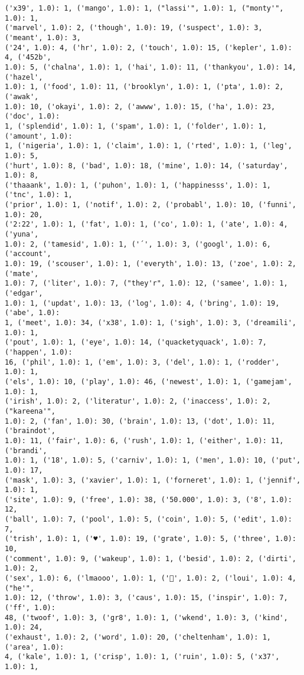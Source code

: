 \documentclass[11pt]{article}
\begin{document}
\begin{Verbatim}[commandchars=\\\{\}]
('x39', 1.0): 1, ('mango', 1.0): 1, ("lassi'", 1.0): 1, ("monty'", 1.0): 1,
('marvel', 1.0): 2, ('though', 1.0): 19, ('suspect', 1.0): 3, ('meant', 1.0): 3,
('24', 1.0): 4, ('hr', 1.0): 2, ('touch', 1.0): 15, ('kepler', 1.0): 4, ('452b',
1.0): 5, ('chalna', 1.0): 1, ('hai', 1.0): 11, ('thankyou', 1.0): 14, ('hazel',
1.0): 1, ('food', 1.0): 11, ('brooklyn', 1.0): 1, ('pta', 1.0): 2, ('awak',
1.0): 10, ('okayi', 1.0): 2, ('awww', 1.0): 15, ('ha', 1.0): 23, ('doc', 1.0):
1, ('splendid', 1.0): 1, ('spam', 1.0): 1, ('folder', 1.0): 1, ('amount', 1.0):
1, ('nigeria', 1.0): 1, ('claim', 1.0): 1, ('rted', 1.0): 1, ('leg', 1.0): 5,
('hurt', 1.0): 8, ('bad', 1.0): 18, ('mine', 1.0): 14, ('saturday', 1.0): 8,
('thaaank', 1.0): 1, ('puhon', 1.0): 1, ('happinesss', 1.0): 1, ('tnc', 1.0): 1,
('prior', 1.0): 1, ('notif', 1.0): 2, ('probabl', 1.0): 10, ('funni', 1.0): 20,
('2:22', 1.0): 1, ('fat', 1.0): 1, ('co', 1.0): 1, ('ate', 1.0): 4, ('yuna',
1.0): 2, ('tamesid', 1.0): 1, ('´', 1.0): 3, ('googl', 1.0): 6, ('account',
1.0): 19, ('scouser', 1.0): 1, ('everyth', 1.0): 13, ('zoe', 1.0): 2, ('mate',
1.0): 7, ('liter', 1.0): 7, ("they'r", 1.0): 12, ('samee', 1.0): 1, ('edgar',
1.0): 1, ('updat', 1.0): 13, ('log', 1.0): 4, ('bring', 1.0): 19, ('abe', 1.0):
1, ('meet', 1.0): 34, ('x38', 1.0): 1, ('sigh', 1.0): 3, ('dreamili', 1.0): 1,
('pout', 1.0): 1, ('eye', 1.0): 14, ('quacketyquack', 1.0): 7, ('happen', 1.0):
16, ('phil', 1.0): 1, ('em', 1.0): 3, ('del', 1.0): 1, ('rodder', 1.0): 1,
('els', 1.0): 10, ('play', 1.0): 46, ('newest', 1.0): 1, ('gamejam', 1.0): 1,
('irish', 1.0): 2, ('literatur', 1.0): 2, ('inaccess', 1.0): 2, ("kareena'",
1.0): 2, ('fan', 1.0): 30, ('brain', 1.0): 13, ('dot', 1.0): 11, ('braindot',
1.0): 11, ('fair', 1.0): 6, ('rush', 1.0): 1, ('either', 1.0): 11, ('brandi',
1.0): 1, ('18', 1.0): 5, ('carniv', 1.0): 1, ('men', 1.0): 10, ('put', 1.0): 17,
('mask', 1.0): 3, ('xavier', 1.0): 1, ('forneret', 1.0): 1, ('jennif', 1.0): 1,
('site', 1.0): 9, ('free', 1.0): 38, ('50.000', 1.0): 3, ('8', 1.0): 12,
('ball', 1.0): 7, ('pool', 1.0): 5, ('coin', 1.0): 5, ('edit', 1.0): 7,
('trish', 1.0): 1, ('♥', 1.0): 19, ('grate', 1.0): 5, ('three', 1.0): 10,
('comment', 1.0): 9, ('wakeup', 1.0): 1, ('besid', 1.0): 2, ('dirti', 1.0): 2,
('sex', 1.0): 6, ('lmaooo', 1.0): 1, ('😤', 1.0): 2, ('loui', 1.0): 4, ("he'",
1.0): 12, ('throw', 1.0): 3, ('caus', 1.0): 15, ('inspir', 1.0): 7, ('ff', 1.0):
48, ('twoof', 1.0): 3, ('gr8', 1.0): 1, ('wkend', 1.0): 3, ('kind', 1.0): 24,
('exhaust', 1.0): 2, ('word', 1.0): 20, ('cheltenham', 1.0): 1, ('area', 1.0):
4, ('kale', 1.0): 1, ('crisp', 1.0): 1, ('ruin', 1.0): 5, ('x37', 1.0): 1,

\end{Verbatim}
\end{document}
